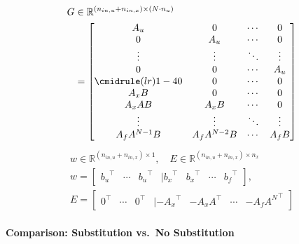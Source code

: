 \begin{align*}
    G & \in \mathbb{R}^{(n_{in,u} + n_{in,x})\times (N\cdot n_u)} \\
      & = \begin{bmatrix}
              A_u                   & 0             & \cdots & 0      \\
              0                     & A_u           & \cdots & 0      \\
              \vdots                & \vdots        & \ddots & \vdots \\
              0                     & 0             & \cdots & A_u    \\
              \cmidrule(lr){1-4}  0 & 0             & \cdots & 0      \\
              A_x B                 & 0             & \cdots & 0      \\
              A_x AB                & A_x B         & \cdots & 0      \\
              \vdots                & \vdots        & \ddots & \vdots \\
              A_f A^{N-1} B         & A_f A^{N-2} B & \cdots & A_f B
          \end{bmatrix}
\end{align*}
\begin{gather*}
    w \in \mathbb{R}^{(n_{in,u} + n_{in,x})\times 1},\quad E \in \mathbb{R}^{(n_{in,u} + n_{in,x})\times n_x}\\
    w = \begin{bmatrix}
        {b_u                    }^\top &
        \cdots                         &
        {b_u                    }^\top &
        |{b_x                   }^\top &
        {b_x                    }^\top &
        \cdots                         &
        {b_f                    }^\top
    \end{bmatrix}, \\
    E = \begin{bmatrix}
        {0                       }^\top &
        \cdots                          &
        {0                       }^\top &
        |{ -A_x                  }^\top &
        {-A_x A                  }^\top &
        \cdots                          &
        {-A_f A^N}^\top
    \end{bmatrix}
\end{gather*}

\paragraph{Comparison: Substitution vs.\ No Substitution}

